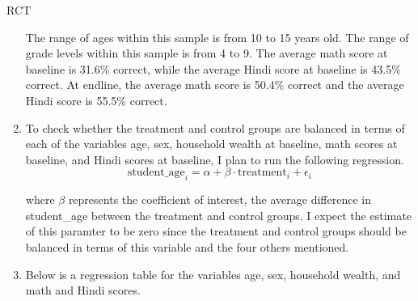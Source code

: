 \begin{homeworkProblem}{RCT}
\begin{solution}
\begin{enumerate}
                The range of ages within this sample is from 10 to 15 years 
                old. The range of grade levels within this sample is from 4 to 
                9. The average math score at baseline is 31.6\% correct, while 
                the average Hindi score at baseline is 43.5\% correct. At 
                endline, the average math score is 50.4\% correct and the 
                average Hindi score is 55.5\% correct.

            \item To check whether the treatment and control groups are
                balanced in terms of each of the variables age, sex, household
                wealth at baseline, math scores at baseline, and Hindi scores
                at baseline, I plan to run the following regression. 
                \[
                    \text{student\_age}_i = \alpha + \beta \cdot \text{treatment}_i + \epsilon_i
                \]

                where $\beta$ represents the coefficient of interest, the
                average difference in student\_age between the treatment and 
                control groups. I expect the estimate of this paramter to be 
                zero since the treatment and control groups should be balanced
                in terms of this variable and the four others mentioned. 

            \item Below is a regression table for the variables age, sex, 
                household wealth, and math and Hindi scores.


\end{enumerate}
\end{solution}
\end{homeworkProblem}
